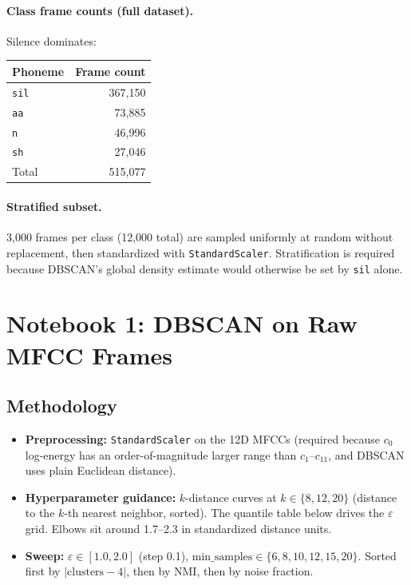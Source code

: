 \documentclass[11pt]{article}
\begin{document}
\paragraph{Class frame counts (full dataset).} Silence dominates:
\begin{table}[H]
\centering
\begin{tabular}{lr}
\toprule
Phoneme & Frame count \\
\midrule
\texttt{sil} & 367{,}150 \\
\texttt{aa}  &  73{,}885 \\
\texttt{n}   &  46{,}996 \\
\texttt{sh}  &  27{,}046 \\
\midrule
Total        & 515{,}077 \\
\bottomrule
\end{tabular}
\end{table}

\paragraph{Stratified subset.} 3{,}000 frames per class (12{,}000 total) are sampled uniformly at random without replacement, then standardized with \texttt{StandardScaler}. Stratification is required because DBSCAN's global density estimate would otherwise be set by \texttt{sil} alone.

\section*{Notebook 1: DBSCAN on Raw MFCC Frames}

\subsection*{Methodology}

\begin{itemize}
\item \textbf{Preprocessing:} \texttt{StandardScaler} on the 12D MFCCs (required because $c_0$ log-energy has an order-of-magnitude larger range than $c_1$--$c_{11}$, and DBSCAN uses plain Euclidean distance).
\item \textbf{Hyperparameter guidance:} $k$-distance curves at $k \in \{8, 12, 20\}$ (distance to the $k$-th nearest neighbor, sorted). The quantile table below drives the $\varepsilon$ grid. Elbows sit around 1.7--2.3 in standardized distance units.
\item \textbf{Sweep:} $\varepsilon \in [1.0, 2.0]$ (step 0.1), $\text{min\_samples} \in \{6, 8, 10, 12, 15, 20\}$. Sorted first by $|\text{clusters} - 4|$, then by NMI, then by noise fraction.
\end{itemize}
\end{document}
